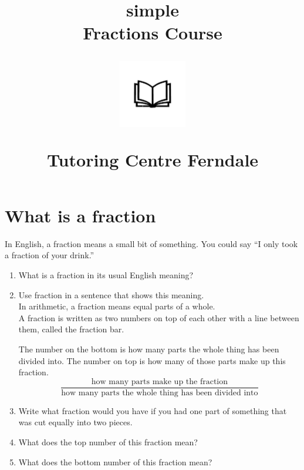 \documentclass[14pt]{article}
\title{simple\\Fractions Course\\
\begin{center}
\includegraphics[width=4em]{ApS_logo.png}
\end{center}
\begin{normalsize}Tutoring Centre Ferndale \end{normalsize}}
\author{}
\date{}
\begin{document}
\maketitle

\section{What is a fraction}

In English, a fraction means a small bit of something. You could say “I only took a fraction of your drink.”\\

\begin{enumerate}

\item What is a fraction in its usual English meaning?
\item Use fraction in a sentence that shows this meaning.\\

In arithmetic, a fraction means  equal parts of a whole.\\

A fraction is written as two numbers on top of each other with a line between them, called the fraction bar.

The number on the bottom is how many parts the whole thing has been divided into. The number on top is how many of those parts make up this fraction.\\

$$\frac{\textrm{how many parts make up the fraction}}{\textrm{how many parts the whole thing has been divided into}}$$

\item Write what fraction would you have if you had one part of something that was cut equally into two pieces.
\item What does the top number of this fraction mean?
\item What does the bottom number of this fraction mean?\\

\\


\end{enumerate}
\end{document}
